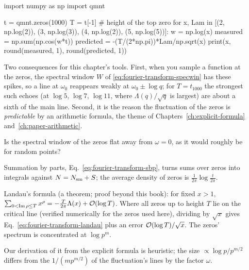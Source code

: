 \begin{pycode}
import numpy as np
import qmnt

t = qmnt.zeros(1000)
T = t[-1]                                   # height of the top zero
for x, Lam in [(2, np.log(2)), (3, np.log(3)), (4, np.log(2)), (5, np.log(5))]:
    w = np.log(x)
    measured = np.sum(np.cos(w*t))
    predicted = -(T/(2*np.pi))*Lam/np.sqrt(x)
    print(x, round(measured, 1), round(predicted, 1))
\end{pycode}

Two consequences for this chapter's tools. First, when you sample a function at the zeros, the spectral window $W$ of \eqref{eq:fourier-transform-specwin} has these spikes, so a line at $\omega_0$ reappears weakly at $\omega_0\pm\log q$; for $T=t_{1000}$ the strongest such echoes (at $\log5$, $\log7$, $\log11$, where $\Lambda(q)/\sqrt q$ is largest) are about a sixth of the main line. Second, it is the reason the fluctuation of the zeros is \emph{predictable} by an arithmetic formula, the theme of Chapters~\ref{ch:explicit-formula} and~\ref{ch:paper-arithmetic}.

\begin{checkpoint}
Is the spectral window of the zeros flat away from $\omega=0$, as it would roughly be for random points?
\end{checkpoint}

\begin{keyideas}

\item Summation by parts, Eq.~\eqref{eq:fourier-transform-sbp}, turns sums over zeros into integrals against $N=N_{\rm sm}+S$; the average density of zeros is $\frac1{2\pi}\log\frac t{2\pi}$.
\item Landau's formula (a theorem; proof beyond this book): for fixed $x>1$, $\sum_{0<\operatorname{Im}\rho\le T}x^{\rho}=-\frac{T}{2\pi}\Lambda(x)+\mathcal{O}(\log T)$. Where all zeros up to height $T$ lie on the critical line (verified numerically for the zeros used here), dividing by $\sqrt x$ gives Eq.~\eqref{eq:fourier-transform-landau} plus an error $\mathcal{O}(\log T)/\sqrt x$. The zeros' spectrum is concentrated at $\log p^m$.
\item Our derivation of it from the explicit formula is heuristic; the size $\propto\log p/p^{m/2}$ differs from the $1/(mp^{m/2})$ of the fluctuation's lines by the factor $\omega$.

\end{keyideas}

